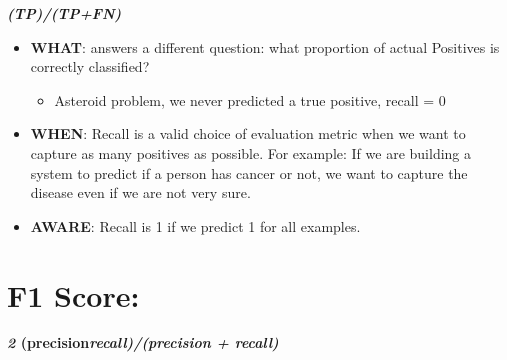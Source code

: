 \documentclass[
]{book}
\providecommand{\tightlist}{%
  \setlength{\itemsep}{0pt}\setlength{\parskip}{0pt}}
\begin{document}
\textbf{\emph{(TP)/(TP+FN)}}

\begin{itemize}
\item
  \textbf{WHAT}: answers a different question: what proportion of actual Positives is correctly classified?

  \begin{itemize}
  \tightlist
  \item
    Asteroid problem, we never predicted a true positive, recall = 0
  \end{itemize}
\item
  \textbf{WHEN}: Recall is a valid choice of evaluation metric when we want to capture as many positives as possible. For example: If we are building a system to predict if a person has cancer or not, we want to capture the disease even if we are not very sure.
\item
  \textbf{AWARE}: Recall is 1 if we predict 1 for all examples.
\end{itemize}

\hypertarget{f1-score-8}{%
\section{F1 Score:}\label{f1-score-8}}

\textbf{\emph{2} (precision\emph{recall)/(precision + recall)}}
\end{document}
